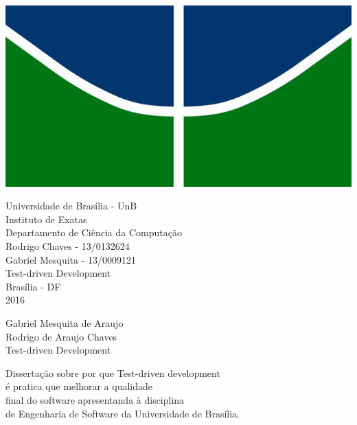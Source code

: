 \documentclass[12pt]{article}
\begin{document}
    \begin{center}
    \includegraphics[scale=0.5]{unb}
    \par
    \vspace{15mm}
    \normalsize{Universidade de Brasília - UnB}\\
    \normalsize{Instituto de Exatas}\\
    \normalsize{Departamento de Ciência da Computação}\\
    \vspace{15mm}
    \normalsize{Rodrigo Chaves - 13/0132624}\\
    \normalsize{Gabriel Mesquita - 13/0009121}\\
    \vspace{15mm}
    \Huge{Test-driven Development}\\

    \vspace{60mm}
    \normalsize{Brasília - DF}\\
    \textnormal{2016}
  \end{center}

  \clearpage

  \begin{center}
    Gabriel Mesquita de Araujo\\
    Rodrigo de Araujo Chaves\\
    \vspace{30mm}
    \Huge{Test-driven Development}
    \vspace{30mm}
    \normalsize{}
    \begin{flushright}
      Dissertação sobre por que Test-driven development\\
      é pratica que melhorar a qualidade\\
      final do software apresentanda à disciplina\\
      de Engenharia de Software da Universidade de Brasília.\\
    \end{flushright}
  \end{center}
\end{document}
